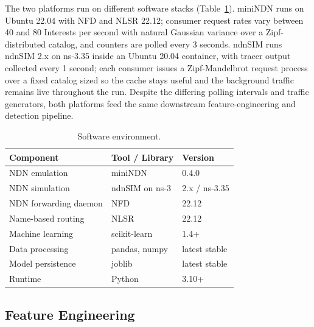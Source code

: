 The two platforms run on different software stacks (Table~\ref{tab:software}). miniNDN runs on Ubuntu 22.04 with NFD and NLSR 22.12; consumer request rates vary between 40 and 80 Interests per second with natural Gaussian variance over a Zipf-distributed catalog, and counters are polled every 3 seconds. ndnSIM runs ndnSIM 2.x on ns-3.35 inside an Ubuntu 20.04 container, with tracer output collected every 1 second; each consumer issues a Zipf-Mandelbrot request process over a fixed catalog sized so the cache stays useful and the background traffic remains live throughout the run. Despite the differing polling intervals and traffic generators, both platforms feed the same downstream feature-engineering and detection pipeline.

\begin{table}[t]
\centering
\caption{Software environment.}
\label{tab:software}
\begin{tabular}{@{}lll@{}}
\toprule
\textbf{Component}        & \textbf{Tool / Library}   & \textbf{Version}  \\
\midrule
NDN emulation             & miniNDN                   & 0.4.0             \\
NDN simulation            & ndnSIM on ns-3            & 2.x / ns-3.35     \\
NDN forwarding daemon     & NFD                       & 22.12             \\
Name-based routing        & NLSR                      & 22.12             \\
Machine learning          & scikit-learn              & 1.4+              \\
Data processing           & pandas, numpy             & latest stable     \\
Model persistence         & joblib                    & latest stable     \\
Runtime                   & Python                    & 3.10+             \\
\bottomrule
\end{tabular}
\end{table}

\subsection{Feature Engineering}
\label{sec:features}

